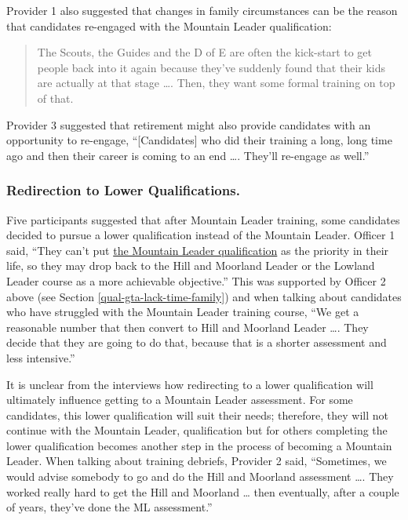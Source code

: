 \documentclass[
  12pt,
  a4paper,
]{book}
\begin{document}
Provider 1 also suggested that changes in family circumstances can be the reason that candidates re-engaged with the Mountain Leader qualification:

\begin{quote}
The Scouts, the Guides and the D of E are often the kick-start to get people back into it again because they've suddenly found that their kids are actually at that stage \ldots. Then, they want some formal training on top of that.
\end{quote}

Provider 3 suggested that retirement might also provide candidates with an opportunity to re-engage, ``{[}Candidates{]} who did their training a long, long time ago and then their career is coming to an end \ldots. They'll re-engage as well.''

\hypertarget{ml-qualitative-gta-redirection-lower}{%
\subsubsection{Redirection to Lower Qualifications.}\label{ml-qualitative-gta-redirection-lower}}

Five participants suggested that after Mountain Leader training, some candidates decided to pursue a lower qualification instead of the Mountain Leader. Officer 1 said, ``They can't put \protect\hyperlink{the-mountain-leader-qualification}{the Mountain Leader qualification} as the priority in their life, so they may drop back to the Hill and Moorland Leader or the Lowland Leader course as a more achievable objective.'' This was supported by Officer 2 above (see Section \ref{qual-gta-lack-time-family}) and when talking about candidates who have struggled with the Mountain Leader training course, ``We get a reasonable number that then convert to Hill and Moorland Leader \ldots. They decide that they are going to do that, because that is a shorter assessment and less intensive.''

It is unclear from the interviews how redirecting to a lower qualification will ultimately influence getting to a Mountain Leader assessment. For some candidates, this lower qualification will suit their needs; therefore, they will not continue with the Mountain Leader, qualification but for others completing the lower qualification becomes another step in the process of becoming a Mountain Leader. When talking about training debriefs, Provider 2 said, ``Sometimes, we would advise somebody to go and do the Hill and Moorland assessment \ldots. They worked really hard to get the Hill and Moorland \ldots{} then eventually, after a couple of years, they've done the ML assessment.''
\end{document}
